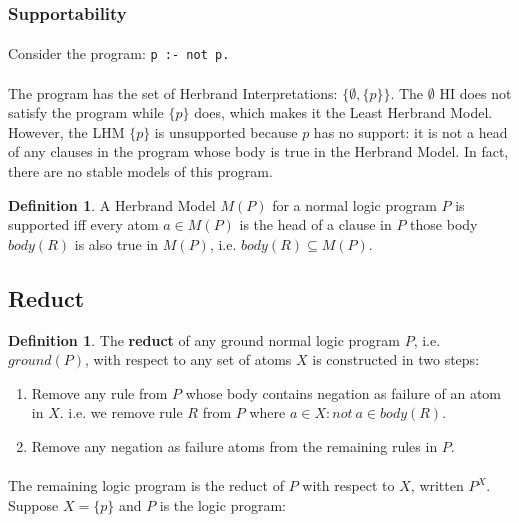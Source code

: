 \documentclass{article}
\theoremstyle{plain}
\theoremstyle{definition}
\newtheorem{defn}[thm]{Definition} %
\begin{document}
\begin{multicols}{2}
\subsubsection{Supportability}

\paragraph{} Consider the program: \lstinline{p :- not p.}

\paragraph{} The program has the set of Herbrand Interpretations: $\{\emptyset, \{p\}\}$. The $\emptyset$ HI does not satisfy the program while $\{p\}$ does, which makes it the Least Herbrand Model. However, the LHM $\{p\}$ is unsupported because $p$ has no support: it is not a head of any clauses in the program whose body is true in the Herbrand Model. In fact, there are no stable models of this program.

\begin{defn}A Herbrand Model $M(P)$ for a normal logic program $P$ is supported iff every atom $a \in M(P)$ is the head of a clause in $P$ those body $body(R)$ is also true in $M(P)$, i.e. $body(R) \subseteq M(P)$. \end{defn}

\subsection{Reduct}

\begin{defn}The \textbf{reduct} of any ground normal logic program $P$, i.e. $ground(P)$, with respect to any set of atoms $X$ is constructed in two steps:\end{defn}

\begin{enumerate}
\item Remove any rule from $P$ whose body contains negation as failure of an atom in $X$. i.e. we remove rule $R$ from $P$ where $a \in X: not\ a \in body(R)$.
\item Remove any negation as failure atoms from the remaining rules in $P$.
\end{enumerate}

\paragraph{} The remaining logic program is the reduct of $P$ with respect to $X$, written $P^X$. Suppose $X = \{p\}$ and $P$ is the logic program:


\end{multicols}
\end{document}
